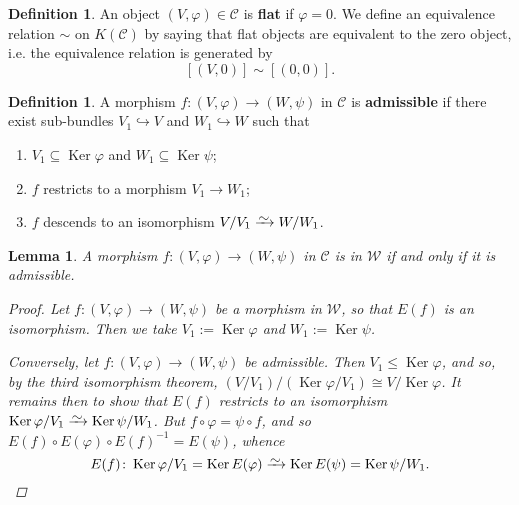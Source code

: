 \documentclass[11pt,fleqn]{article}
\theoremstyle{plain}
\newtheorem{lemma}[theorem]{Lemma}
\theoremstyle{definition}
\newtheorem{definition}[theorem]{Definition}
\theoremstyle{remark}
\numberwithin{equation}{theorem}
\newcommand{\congto}{\xrightarrow{\raisebox{-.5ex}[0ex][0ex]{$\sim$}}}
\newcommand{\define}[1]{\textbf{#1}}
\DeclareMathOperator{\Ker}{Ker}
\begin{document}
        \begin{definition}
            An object $(V,\varphi)\in\mathcal{C}$ is \define{flat} if $\varphi=0$.
            We define an equivalence relation $\sim$ on $K(\mathcal{C})$ by saying that flat objects are equivalent to the zero object, i.e. the equivalence relation is generated by
            \[
                [(V,0)]\sim[(0,0)].
            \]
        \end{definition}

        \begin{definition}\label{definition:admissible-morphism-in-C}
            A morphism $f\colon(V,\varphi)\to(W,\psi)$ in $\mathcal{C}$ is \define{admissible} if there exist sub-bundles $V_1\hookrightarrow V$ and $W_1\hookrightarrow W$ such that
            \begin{enumerate}
                \item $V_1\subseteq\Ker\varphi$ and $W_1\subseteq\Ker\psi$;
                \item $f$ restricts to a morphism $V_1\to W_1$;
                \item $f$ descends to an isomorphism $V/V_1\congto W/W_1$.
            \end{enumerate}
        \end{definition}

        \begin{lemma}\label{lemma:admissible-example-definition}
            A morphism $f\colon(V,\varphi)\to(W,\psi)$ in $\mathcal{C}$ is in $\mathcal{W}$ if and only if it is admissible.
            \begin{proof}
                Let $f\colon(V,\varphi)\to(W,\psi)$ be a morphism in $\mathcal{W}$, so that $E(f)$ is an isomorphism.
                Then we take $V_1:=\Ker\varphi$ and $W_1:=\Ker\psi$.

                Conversely, let $f\colon(V,\varphi)\to(W,\psi)$ be admissible.
                Then $V_1\leqslant\Ker\varphi$, and so, by the third isomorphism theorem, $(V/V_1)/(\Ker\varphi/V_1)\cong V/\Ker\varphi$.
                It remains then to show that $E(f)$ restricts to an isomorphism $\Ker\varphi/V_1\congto\Ker\psi/W_1$.
                But $f\circ\varphi=\psi\circ f$, and so $E(f)\circ E(\varphi)\circ E(f)^{-1}=E(\psi)$, whence
                \[
                    E(f)\colon\Ker\varphi/V_1=\Ker E(\varphi)\congto\Ker E(\psi)=\Ker\psi/W_1.\qedhere
                \]
            \end{proof}
        \end{lemma}
\end{document}
